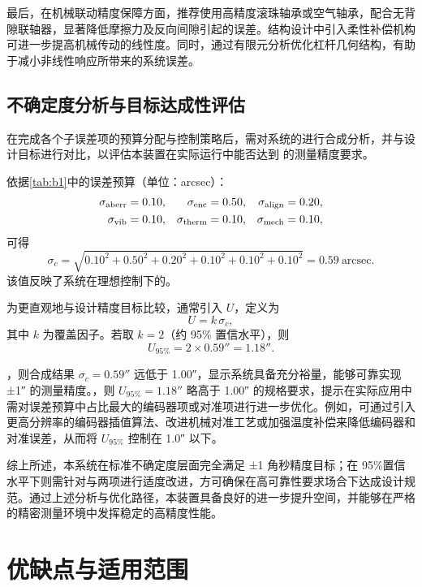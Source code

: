 最后，在机械联动精度保障方面，推荐使用高精度滚珠轴承或空气轴承，配合无背隙联轴器，显著降低摩擦力及反向间隙引起的误差。结构设计中引入柔性补偿机构可进一步提高机械传动的线性度。同时，通过有限元分析优化杠杆几何结构，有助于减小非线性响应所带来的系统误差。

\subsection{不确定度分析与目标达成性评估}

在完成各个子误差项的预算分配与控制策略后，需对系统的进行合成分析，并与设计目标进行对比，以评估本装置在实际运行中能否达到  的测量精度要求。

依据\cref{tab:b1}中的误差预算（单位：arcsec）：
$$
\begin{aligned}
	\sigma_{\rm aberr} &= 0.10, & \sigma_{\rm enc} &= 0.50, & \sigma_{\rm align} &= 0.20,\\
	\sigma_{\rm vib}   &= 0.10, & \sigma_{\rm therm} &= 0.10, & \sigma_{\rm mech}  &= 0.10,
\end{aligned}
$$
可得
$$
\sigma_c 
= \sqrt{0.10^2 + 0.50^2 + 0.20^2 + 0.10^2 + 0.10^2 + 0.10^2}
= 0.59~\text{arcsec}.
$$
该值反映了系统在理想控制下的。

为更直观地与设计精度目标比较，通常引入 $U$，定义为
$$
U = k\,\sigma_c,
$$
其中 $k$ 为覆盖因子。若取 $k = 2$（约 95\% 置信水平），则
$$
U_{95\%} = 2 \times 0.59'' = 1.18''.
$$

，则合成结果 $\sigma_c = 0.59''$ 远低于 1.00″，显示系统具备充分裕量，能够可靠实现 ±1″ 的测量精度。，则 $U_{95\%} = 1.18''$ 略高于 1.00″ 的规格要求，提示在实际应用中需对误差预算中占比最大的编码器项或对准项进行进一步优化。例如，可通过引入更高分辨率的编码器插值算法、改进机械对准工艺或加强温度补偿来降低编码器和对准误差，从而将 $U_{95\%}$ 控制在 1.0″ 以下。

\begin{uclaim}
	综上所述，本系统在标准不确定度层面完全满足 ±1 角秒精度目标；在 95\%置信水平下则需针对与两项进行适度改进，方可确保在高可靠性要求场合下达成设计规范。通过上述分析与优化路径，本装置具备良好的进一步提升空间，并能够在严格的精密测量环境中发挥稳定的高精度性能。
\end{uclaim}

\section{优缺点与适用范围 }

